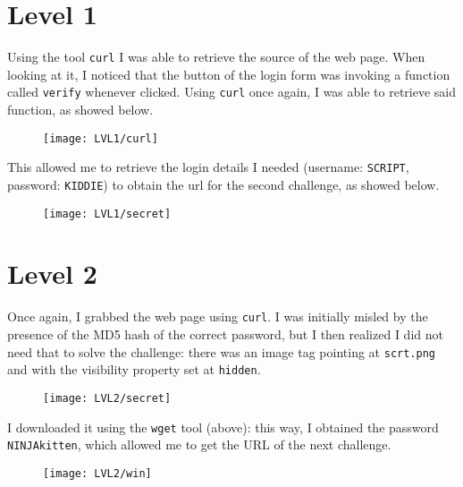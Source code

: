 \documentclass[12pt,a4paper]{article}
\begin{document}
	\section*{Level 1}

	Using the tool \texttt{curl} I was able to retrieve the source of the web page. When looking at it, I noticed that the button of the login form was invoking a function called \texttt{verify} whenever clicked. Using \texttt{curl} once again, I was able to retrieve said function, as showed below.
	\begin{figure}[H]
		\centering
		\texttt{[image: LVL1/curl]}
		\label{fig:curl}
	\end{figure}
	This allowed me to retrieve the login details I needed (username: \texttt{SCRIPT}, password: \texttt{KIDDIE}) to obtain the url for the second challenge, as showed below.
	\begin{figure}[H]
		\centering
		\texttt{[image: LVL1/secret]}
		\label{fig:secret1}
	\end{figure}

	\section*{Level 2}
	Once again, I grabbed the web page using \texttt{curl}. I was initially misled by the presence of the MD5 hash of the correct password, but I then realized I did not need that to solve the challenge: there was an image tag pointing at \texttt{scrt.png} and with the visibility property set at \texttt{hidden}.
	\begin{figure}[H]
		\centering
		\texttt{[image: LVL2/secret]}
		\label{fig:secret2}
	\end{figure}
	I downloaded it using the \texttt{wget} tool (above): this way, I obtained the password \texttt{NINJAkitten}, which allowed me to get the URL of the next challenge.
	\begin{figure}[H]
		\centering
		\texttt{[image: LVL2/win]}
		\label{fig:win2}
	\end{figure}
	\newpage
	
\end{document}
